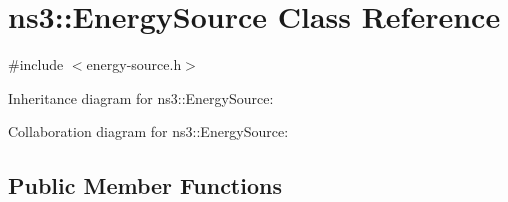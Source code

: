 \hypertarget{classns3_1_1EnergySource}{}\section{ns3\+:\+:Energy\+Source Class Reference}
\label{classns3_1_1EnergySource}


{\ttfamily \#include $<$energy-\/source.\+h$>$}



Inheritance diagram for ns3\+:\+:Energy\+Source\+:


Collaboration diagram for ns3\+:\+:Energy\+Source\+:
\subsection*{Public Member Functions}
